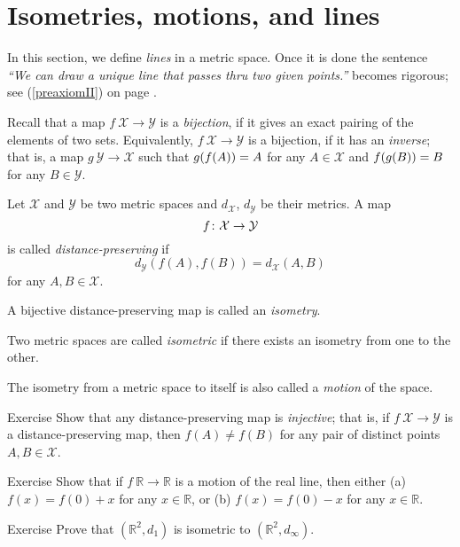 \section*{Isometries, motions, and lines}

In this section, we define {}\emph{lines} in a metric space.
Once it is done the sentence {}\emph{``We can draw a unique line that passes thru two given points.''} becomes rigorous; see (\ref{preaxiomII}) on page \pageref{preaxiomII}. 

Recall that a map $f\:\mathcal{X}\to\mathcal{Y}$
is a \emph{bijection},
if it gives an exact pairing of the elements of two sets.
Equivalently, $f\:\mathcal{X}\to\mathcal{Y}$ is a bijection, if it has an \emph{inverse};
that is, a map $g\:\mathcal{Y}\to\mathcal{X}$
such that 
$g(f(A))\z=A$ for any $A\in\mathcal{X}$
and
$f(g(B))\z=B$ for any $B\in\mathcal{Y}$. 

Let $\mathcal X$ and $\mathcal Y$ be two metric spaces and $d_{\mathcal X}$, $d_{\mathcal Y}$ be their metrics. 
A map 
$$f\:\mathcal X \z\to \mathcal Y$$ 
is
called \emph{distance-preserving} if 
$$d_{\mathcal Y}(f(A), f(B))
 = d_{\mathcal X}(A,B)$$
for any $A,B\in {\mathcal X}$.

A bijective distance-preserving map is called an \emph{isometry}. 

Two metric spaces are called
\emph{isometric} if there exists an isometry from one to the other.

The isometry from a metric space to itself 
is also called a \emph{motion} of the space.

\begin{thm}{Exercise}\label{ex:dist-preserv=>injective}
Show that any distance-preserving map is \emph{injective};
that is, if $f\:\mathcal X\to\mathcal Y$ is a distance-preserving map, 
then $f(A)\ne f(B)$ for any pair of distinct points $A, B\in \mathcal X$.
\end{thm}

\begin{thm}{Exercise}\label{ex:motion-of-R}
Show that if $f\:\mathbb{R}\to\mathbb{R}$ is a motion of the real line,
then either (a)
$f(x)=f(0)+x$ for any $x\in \mathbb{R}$, 
or (b)
$f(x)=f(0)-x$ for any $x\in \mathbb{R}$. 

\end{thm}

\begin{thm}{Exercise}\label{ex:d_1=d_infty}
Prove that $(\mathbb{R}^2,d_1)$ is isometric to $(\mathbb{R}^2,d_\infty)$.
\end{thm}

